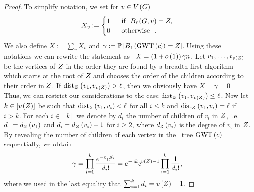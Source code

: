 \begin{proof}
	To simplify notation, we set for $v\in V\left(G\right)$
\begin{align*}
X_v:=
\begin{cases}
	1  & \text{~~if~~} B_{\ell}\left(G, v\right)=Z,\\
	0  & \text{~~otherwise~~}.
\end{cases}	
\end{align*}
We also define $X:=\sum_{v}X_v$ and $\gamma:=\mathbb{P}\left[B_{\ell}\left(\operatorname{GWT}\left(c\right)\right)=Z\right]$. Using these notations we can rewrite the statement as \whp\ $X=\left(1+o\left(1\right)\right)\gamma n$. Let $v_1, \ldots, v_{v\left({Z}\right)}$ be the vertices of $Z$ in the order they are found by a breadth-first algorithm which starts at the root of $Z$ and chooses the order of the children according to their order in $Z$. If $\operatorname{dist}_{Z}\left(v_1, v_{v\left({Z}\right)}\right)>\ell$, then we obviously have $X=\gamma=0$. Thus, we can restrict our considerations to the case $\operatorname{dist}_{Z}\left(v_1, v_{v\left({Z}\right)}\right)\leq\ell$. Now let $k\in[{v\left({Z}\right)}]$ be such that $\operatorname{dist}_{Z}\left(v_1, v_i\right)<\ell$ for all $i\leq k$ and $\operatorname{dist}_{Z}\left(v_1, v_i\right)=\ell$ if $i>k$. For each $i\in[k]$ we denote by $d_i$ the number of children of $v_i$ in $Z$, i.e. $d_1=d_{Z}\left(v_1\right)$ and $d_i=d_{Z}\left(v_i\right)-1$ for $i\geq 2$, where $d_{Z}\left(v_i\right)$ is the degree of $v_i$ in $Z$. By revealing the number of children of each vertex in the \GW\ tree $\operatorname{GWT}\left(c\right)$ sequentially, we obtain
\begin{align}\label{LSeq:16}
\gamma=\prod_{i=1}^{k}\frac{e^{-c}c^{d_i}}{d_i!}=e^{-ck}c^{v\left({Z}\right)-1}\prod_{i=1}^{k}\frac{1}{d_i!},
\end{align}
where we used in the last equality that $\sum_{i=1}^{k}d_i=v\left({Z}\right)-1$.


\end{proof}
